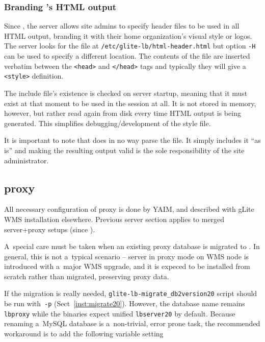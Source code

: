 \subsubsection{Branding \LB's HTML output}
\label{inst:branding}

Since , the server allows site admins to specify header files to be used in all HTML output, branding it with their home organization's visual style or logos. The server looks for the file at \texttt{/etc/glite-lb/html-header.html} but option \texttt{-H} can be used to specify a different location. The contents of the file are inserted verbatim between the \texttt{<head>} and \texttt{</head>} tags and typically they will give a \texttt{<style>} definition. 

The include file's existence is checked on server startup, meaning that it must exist at that moment to be used in the session at all. It is not stored in memory, however, but rather read again from disk every time HTML output is being generated. This simplifies debugging/development of the style file.

It is important to note that \LB does in no way parse the file. It simply includes it ``as is'' and making the resulting output valid is the sole responsibility of the site administrator.

\subsection{\LB proxy}
\label{inst:LBproxy}


All necessary configuration of \LB proxy is done by YAIM,
and described with gLite WMS installation elsewhere.
Previous \LB server section applies to merged server+proxy setups (since ).

A~special care must be taken when an existing \LB proxy database
is migrated to .
In general, this is not a~typical scenario --  server in proxy mode
on WMS node is introduced with a~major WMS upgrade, and it is expeced
to be installed from scratch rather than migrated, preserving \LB proxy data.

If the migration is really needed, \verb'glite-lb-migrate_db2version20'
script should be run with~\verb'-p' (Sect~\ref{inst:migrate20}).
However, the \LB database name remains \verb'lbproxy' while
the  binaries expect unified \verb'lbserver20' by default.
Because renaming a~MySQL database is a~non-trivial, error prone task,
the recommended workaround is to add the following variable setting

